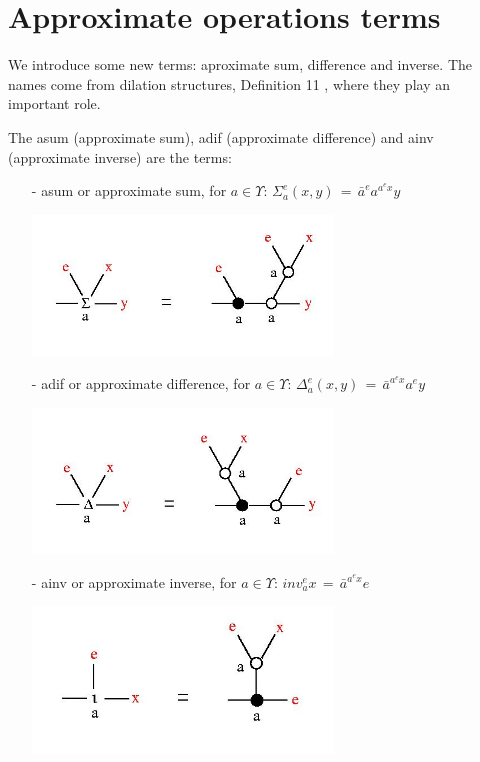 \section{Approximate operations terms}

We introduce some new terms: aproximate sum, difference and inverse. The names come from dilation structures, Definition 11 \cite{buligadil1},  where they play an important role. 



\begin{definition}
The asum (approximate sum), adif (approximate difference) and ainv (approximate inverse) are the terms: 
\begin{enumerate}
\item[-] asum or approximate sum, for $a \in \Upsilon$: $\displaystyle \Sigma_{a}^{e}(x,y) \, = \, \bar{a}^{e} a^{a^{e} x} y$

\centerline{\includegraphics[width=80mm]{jpg/asum.jpg}}  
\item[-] adif or approximate difference, for $a \in \Upsilon$: $\displaystyle \Delta_{a}^{e}(x,y) \, = \, \bar{a}^{a^{e} x} a^{e} y$

\centerline{\includegraphics[width=80mm]{jpg/adif.jpg}}  
\item[-] ainv or approximate inverse, for $a \in \Upsilon$: $\displaystyle inv_{a}^{e} x \, = \, \bar{a}^{a^{e} x} e$

\centerline{\includegraphics[width=80mm]{jpg/ainv.jpg}}  
\end{enumerate}
\label{aterms}
\end{definition}

